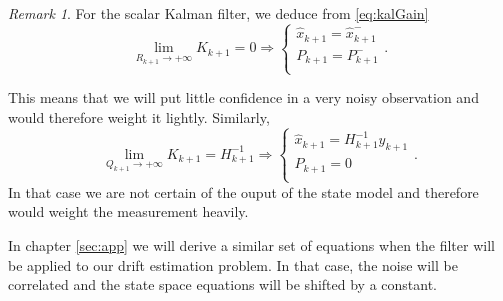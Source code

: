 \documentclass{article}
\theoremstyle{definition}
\theoremstyle{remark}
\newtheorem{remark}[thm]{Remark}
\begin{document}
\begin{remark}For the scalar Kalman filter, we deduce from \eqref{eq:kalGain}
\begin{equation}
\lim_{R_{k+1} \to +\infty}K_{k+1}=0 \Rightarrow 
\left\{ \begin{array}{lcrcr}
          \hat{x}_{k+1}=\hat{x}_{k+1}^-  \\ 
          P_{k+1}=P_{k+1}^- \\ 
        \end{array} \right. .
\end{equation}

This means that we will put little confidence in a very noisy observation and would therefore weight it lightly. Similarly,
\begin{equation}
\lim_{Q_{k+1} \to +\infty}K_{k+1}=H_{k+1}^{-1} \Rightarrow 
\left\{ \begin{array}{lcrcr}
          \hat{x}_{k+1}=H_{k+1}^{-1}y_{k+1}  \\ 
          P_{k+1}=0 \\ 
        \end{array} \right. .
\end{equation}
In that case we are not certain of the ouput of the state model and therefore would weight the measurement heavily.
\end{remark}

In chapter \ref{sec:app} we will derive a similar set of equations when the filter will be applied to our drift estimation problem. In that case, the noise will be correlated and the state space equations will be shifted by a constant.\\
\end{document}
